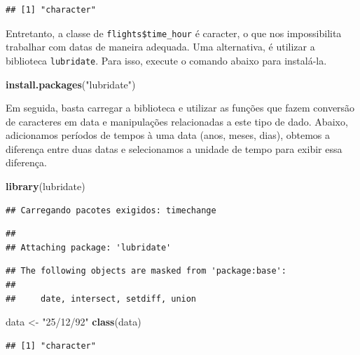 \documentclass[
]{book}
\newenvironment{Shaded}{\begin{snugshade}}{\end{snugshade}}
\newcommand{\FunctionTok}[1]{\textcolor[rgb]{0.13,0.29,0.53}{\textbf{#1}}}
\newcommand{\NormalTok}[1]{#1}
\newcommand{\OtherTok}[1]{\textcolor[rgb]{0.56,0.35,0.01}{#1}}
\newcommand{\StringTok}[1]{\textcolor[rgb]{0.31,0.60,0.02}{#1}}
\begin{document}
\begin{verbatim}
## [1] "character"
\end{verbatim}

Entretanto, a classe de \texttt{flights\$time\_hour} é caracter, o que nos impossibilita trabalhar com datas de maneira adequada.
Uma alternativa, é utilizar a biblioteca \texttt{lubridate}.
Para isso, execute o comando abaixo para instalá-la.

\begin{Shaded}
\begin{Highlighting}[]
\FunctionTok{install.packages}\NormalTok{(}\StringTok{"lubridate"}\NormalTok{)}
\end{Highlighting}
\end{Shaded}

Em seguida, basta carregar a biblioteca e utilizar as funções que fazem conversão de caracteres em data e manipulações relacionadas a este tipo de dado.
Abaixo, adicionamos períodos de tempos à uma data (anos, meses, dias), obtemos a diferença entre duas datas e selecionamos a unidade de tempo para exibir essa diferença.

\begin{Shaded}
\begin{Highlighting}[]
\FunctionTok{library}\NormalTok{(lubridate)}
\end{Highlighting}
\end{Shaded}

\begin{verbatim}
## Carregando pacotes exigidos: timechange
\end{verbatim}

\begin{verbatim}
## 
## Attaching package: 'lubridate'
\end{verbatim}

\begin{verbatim}
## The following objects are masked from 'package:base':
## 
##     date, intersect, setdiff, union
\end{verbatim}

\begin{Shaded}
\begin{Highlighting}[]
\NormalTok{data }\OtherTok{\textless{}{-}} \StringTok{"25/12/92"}
\FunctionTok{class}\NormalTok{(data)}
\end{Highlighting}
\end{Shaded}

\begin{verbatim}
## [1] "character"
\end{verbatim}
\end{document}
